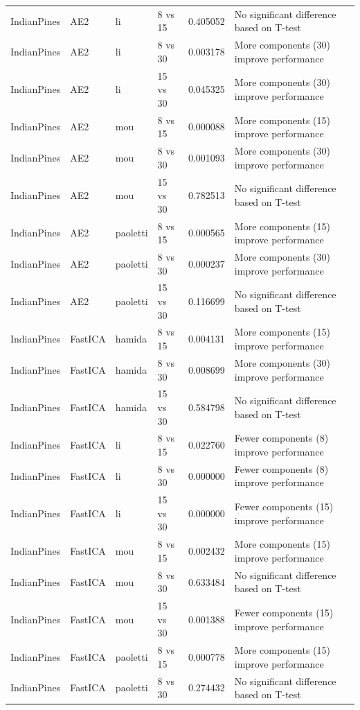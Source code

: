 \begin{longtable}{llllrl}
IndianPines & AE2 & li & 8 vs 15 & 0.405052 & No significant difference based on T-test \\
IndianPines & AE2 & li & 8 vs 30 & 0.003178 & More components (30) improve performance \\
IndianPines & AE2 & li & 15 vs 30 & 0.045325 & More components (30) improve performance \\
IndianPines & AE2 & mou & 8 vs 15 & 0.000088 & More components (15) improve performance \\
IndianPines & AE2 & mou & 8 vs 30 & 0.001093 & More components (30) improve performance \\
IndianPines & AE2 & mou & 15 vs 30 & 0.782513 & No significant difference based on T-test \\
IndianPines & AE2 & paoletti & 8 vs 15 & 0.000565 & More components (15) improve performance \\
IndianPines & AE2 & paoletti & 8 vs 30 & 0.000237 & More components (30) improve performance \\
IndianPines & AE2 & paoletti & 15 vs 30 & 0.116699 & No significant difference based on T-test \\
IndianPines & FastICA & hamida & 8 vs 15 & 0.004131 & More components (15) improve performance \\
IndianPines & FastICA & hamida & 8 vs 30 & 0.008699 & More components (30) improve performance \\
IndianPines & FastICA & hamida & 15 vs 30 & 0.584798 & No significant difference based on T-test \\
IndianPines & FastICA & li & 8 vs 15 & 0.022760 & Fewer components (8) improve performance \\
IndianPines & FastICA & li & 8 vs 30 & 0.000000 & Fewer components (8) improve performance \\
IndianPines & FastICA & li & 15 vs 30 & 0.000000 & Fewer components (15) improve performance \\
IndianPines & FastICA & mou & 8 vs 15 & 0.002432 & More components (15) improve performance \\
IndianPines & FastICA & mou & 8 vs 30 & 0.633484 & No significant difference based on T-test \\
IndianPines & FastICA & mou & 15 vs 30 & 0.001388 & Fewer components (15) improve performance \\
IndianPines & FastICA & paoletti & 8 vs 15 & 0.000778 & More components (15) improve performance \\
IndianPines & FastICA & paoletti & 8 vs 30 & 0.274432 & No significant difference based on T-test \\

\end{longtable}
